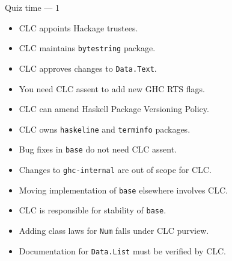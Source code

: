 \documentclass[handout]{beamer}
\begin{document}
\begin{frame}{Quiz time --- 1}

\begin{itemize}[<+->]

\item CLC appoints Hackage trustees.
\item CLC maintains {\tt bytestring} package.
\item CLC approves changes to {\tt Data.Text}.
\item You need CLC assent to add new GHC RTS flags.
\item CLC can amend Haskell Package Versioning Policy.
\item CLC owns {\tt haskeline} and {\tt terminfo} packages.
\item Bug fixes in {\tt base} do not need CLC assent.
\item Changes to {\tt ghc-internal} are out of scope for CLC.
\item Moving implementation of {\tt base} elsewhere involves CLC.
\item CLC is responsible for stability of {\tt base}.
\item Adding class laws for {\tt Num} falls under CLC purview.
\item Documentation for {\tt Data.List} must be verified by CLC.

\end{itemize}

\end{frame}
\end{document}
